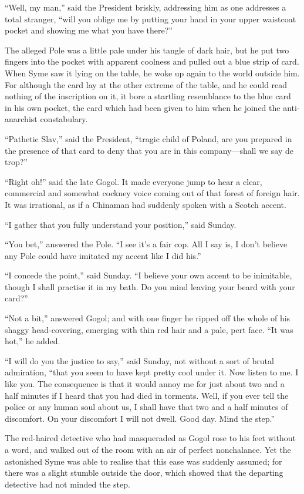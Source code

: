 “Well, my man,” said the President briskly, addressing him as one addresses a total stranger, “will you oblige me by putting your hand in your upper waistcoat pocket and showing me what you have there?”

The alleged Pole was a little pale under his tangle of dark hair, but he put two fingers into the pocket with apparent coolness and pulled out a blue strip of card. When Syme saw it lying on the table, he woke up again to the world outside him. For although the card lay at the other extreme of the table, and he could read nothing of the inscription on it, it bore a startling resemblance to the blue card in his own pocket, the card which had been given to him when he joined the anti-anarchist constabulary.

“Pathetic Slav,” said the President, “tragic child of Poland, are you prepared in the presence of that card to deny that you are in this company⁠—shall we say de trop?”

“Right oh!” said the late Gogol. It made everyone jump to hear a clear, commercial and somewhat cockney voice coming out of that forest of foreign hair. It was irrational, as if a Chinaman had suddenly spoken with a Scotch accent.

“I gather that you fully understand your position,” said Sunday.

“You bet,” answered the Pole. “I see it’s a fair cop. All I say is, I don’t believe any Pole could have imitated my accent like I did his.”

“I concede the point,” said Sunday. “I believe your own accent to be inimitable, though I shall practise it in my bath. Do you mind leaving your beard with your card?”

“Not a bit,” answered Gogol; and with one finger he ripped off the whole of his shaggy head-covering, emerging with thin red hair and a pale, pert face. “It was hot,” he added.

“I will do you the justice to say,” said Sunday, not without a sort of brutal admiration, “that you seem to have kept pretty cool under it. Now listen to me. I like you. The consequence is that it would annoy me for just about two and a half minutes if I heard that you had died in torments. Well, if you ever tell the police or any human soul about us, I shall have that two and a half minutes of discomfort. On your discomfort I will not dwell. Good day. Mind the step.”

The red-haired detective who had masqueraded as Gogol rose to his feet without a word, and walked out of the room with an air of perfect nonchalance. Yet the astonished Syme was able to realise that this ease was suddenly assumed; for there was a slight stumble outside the door, which showed that the departing detective had not minded the step.


